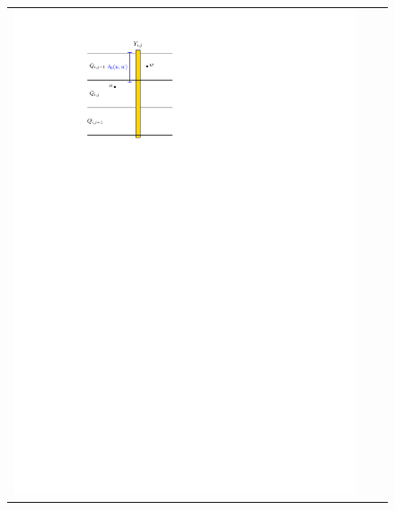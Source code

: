 \documentclass{patmorin}
\begin{document}
\begin{figure}
    \centering
    \begin{tabular}{ccc}
    \includegraphics[page=1,scale=0.9]{figs/new_metric} &

\end{tabular}
\end{figure}
\end{document}
